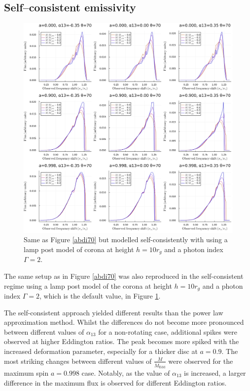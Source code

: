 \documentclass[fleqn,usenatbib,useAMS]{mnras}
\begin{document}
\subsection{Self--consistent emissivity}

\begin{figure}[h!]
    \centering
    \includegraphics[width=\linewidth]{figures/selfconsistent_abdi70.png}
    \caption{Same as Figure \ref{abdi70} but modelled self-consistently with using a lamp post model of corona at height $h=10 r_{g}$ and a photon index $\Gamma = 2$.}
    \label{selfconsistent_abdi70}
\end{figure}

The same setup as in Figure \ref{abdi70} was also reproduced in the self-consistent regime using a lamp post model of the corona at height $h=10 r_{g}$ and a photon index $\Gamma = 2$, which is the default value, in Figure \ref{selfconsistent_abdi70}. 

The self-consistent approach yielded different results than the power law approximation method. Whilst the differences do not become more pronounced between different values of $\alpha_{13}$ for a non-rotating case, additional spikes were observed at higher Eddington ratios. The peak becomes more spiked with the increased deformation parameter, especially for a thicker disc at $a = 0.9$. The most striking changes between different values of $\frac{\dot{M}}{\dot{M}_\text{Edd}}$ were observed for the maximum spin $a = 0.998$ case.  Notably, as the value of $\alpha_{13}$ is increased, a larger difference in the maximum flux is observed for different Eddington ratios.
\end{document}
